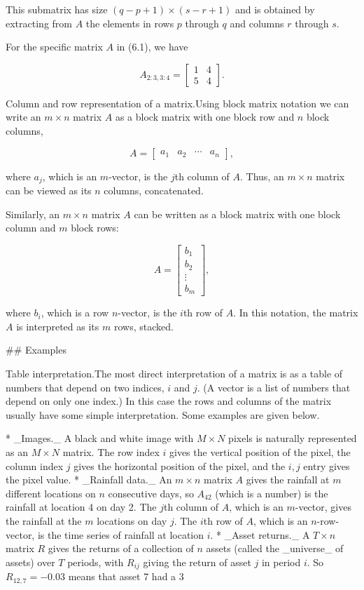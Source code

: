 This submatrix has size \((q-p+1)\times(s-r+1)\) and is obtained by extracting from \(A\) the elements in rows \(p\) through \(q\) and columns \(r\) through \(s\).

For the specific matrix \(A\) in (6.1), we have

\[A_{2:3,3:4}=\left[\begin{array}{cc}1&4\\ 5&4\end{array}\right].\]

Column and row representation of a matrix.Using block matrix notation we can write an \(m\times n\) matrix \(A\) as a block matrix with one block row and \(n\) block columns,

\[A=\left[\begin{array}{cccc}a_{1}&a_{2}&\cdots&a_{n}\end{array}\right],\]

where \(a_{j}\), which is an \(m\)-vector, is the \(j\)th column of \(A\). Thus, an \(m\times n\) matrix can be viewed as its \(n\) columns, concatenated.

Similarly, an \(m\times n\) matrix \(A\) can be written as a block matrix with one block column and \(m\) block rows:

\[A=\left[\begin{array}{c}b_{1}\\ b_{2}\\ \vdots\\ b_{m}\end{array}\right],\]

where \(b_{i}\), which is a row \(n\)-vector, is the \(i\)th row of \(A\). In this notation, the matrix \(A\) is interpreted as its \(m\) rows, stacked.

## Examples

Table interpretation.The most direct interpretation of a matrix is as a table of numbers that depend on two indices, \(i\) and \(j\). (A vector is a list of numbers that depend on only one index.) In this case the rows and columns of the matrix usually have some simple interpretation. Some examples are given below.

* _Images._ A black and white image with \(M\times N\) pixels is naturally represented as an \(M\times N\) matrix. The row index \(i\) gives the vertical position of the pixel, the column index \(j\) gives the horizontal position of the pixel, and the \(i,j\) entry gives the pixel value.
* _Rainfall data._ An \(m\times n\) matrix \(A\) gives the rainfall at \(m\) different locations on \(n\) consecutive days, so \(A_{42}\) (which is a number) is the rainfall at location 4 on day 2. The \(j\)th column of \(A\), which is an \(m\)-vector, gives the rainfall at the \(m\) locations on day \(j\). The \(i\)th row of \(A\), which is an \(n\)-row-vector, is the time series of rainfall at location \(i\).
* _Asset returns._ A \(T\times n\) matrix \(R\) gives the returns of a collection of \(n\) assets (called the _universe_ of assets) over \(T\) periods, with \(R_{ij}\) giving the return of asset \(j\) in period \(i\). So \(R_{12,7}=-0.03\) means that asset 7 had a 3%